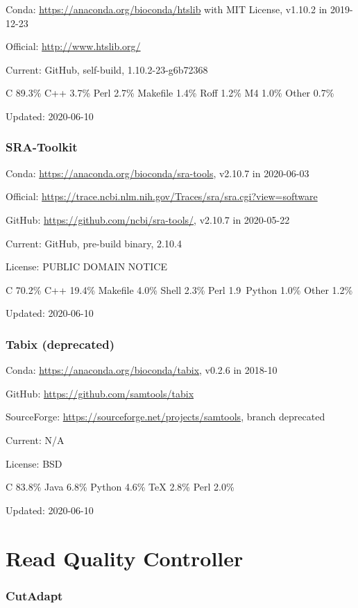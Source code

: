 \documentclass[]{article}
\begin{document}
Conda: \url{https://anaconda.org/bioconda/htslib} with MIT License, v1.10.2 in 2019-12-23

Official: \url{http://www.htslib.org/}

Current: GitHub, self-build,  1.10.2-23-g6b72368

C 89.3\% C++ 3.7\% Perl 2.7\% Makefile 1.4\% Roff 1.2\% M4 1.0\% Other 0.7\%

Updated: 2020-06-10

\section{SRA-Toolkit}

Conda: \url{https://anaconda.org/bioconda/sra-tools}, v2.10.7 in 2020-06-03

Official: \url{https://trace.ncbi.nlm.nih.gov/Traces/sra/sra.cgi?view=software}

GitHub: \url{https://github.com/ncbi/sra-tools/}, v2.10.7 in 2020-05-22

Current: GitHub, pre-build binary, 2.10.4

License: PUBLIC DOMAIN NOTICE

C 70.2\% C++ 19.4\% Makefile 4.0\% Shell 2.3\% Perl 1.9\ Python 1.0\% Other 1.2\%

Updated: 2020-06-10

\section{Tabix (deprecated)}

Conda: \url{https://anaconda.org/bioconda/tabix}, v0.2.6 in 2018-10

GitHub: \url{https://github.com/samtools/tabix}

SourceForge: \url{https://sourceforge.net/projects/samtools}, branch deprecated

Current: N/A

License: BSD

C 83.8\% Java 6.8\% Python 4.6\% TeX 2.8\% Perl 2.0\%

Updated: 2020-06-10

\part{Read Quality Controller}

\section{CutAdapt}
\end{document}
